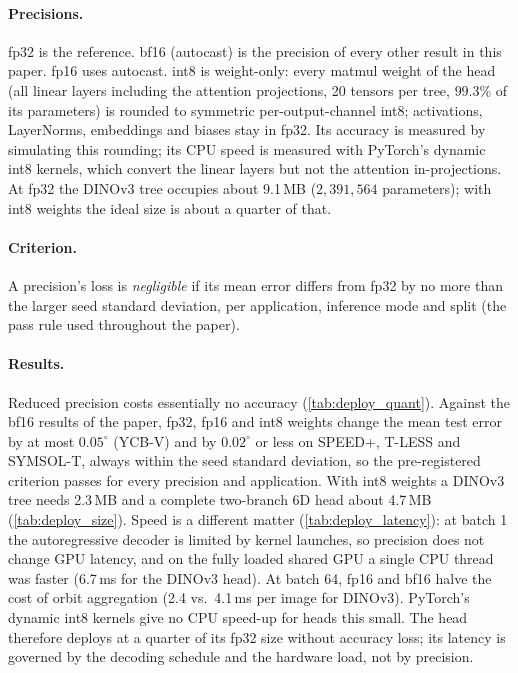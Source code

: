 \paragraph{Precisions.} fp32 is the reference. bf16 (autocast) is the precision of every other result in this paper. fp16 uses autocast. int8 is weight-only: every matmul weight of the head (all linear layers including the attention projections, 20 tensors per tree, $99.3\%$ of its parameters) is rounded to symmetric per-output-channel int8; activations, LayerNorms, embeddings and biases stay in fp32. Its accuracy is measured by simulating this rounding; its CPU speed is measured with PyTorch's dynamic int8 kernels, which convert the linear layers but not the attention in-projections. At fp32 the DINOv3 tree occupies about 9.1\,MB ($2{,}391{,}564$ parameters); with int8 weights the ideal size is about a quarter of that.

\paragraph{Criterion.} A precision's loss is \emph{negligible} if its mean error differs from fp32 by no more than the larger seed standard deviation, per application, inference mode and split (the pass rule used throughout the paper).

\paragraph{Results.} Reduced precision costs essentially no accuracy (\cref{tab:deploy_quant}). Against the bf16 results of the paper, fp32, fp16 and int8 weights change the mean test error by at most $0.05^\circ$ (YCB-V) and by $0.02^\circ$ or less on SPEED+, T-LESS and SYMSOL-T, always within the seed standard deviation, so the pre-registered criterion passes for every precision and application. With int8 weights a DINOv3 tree needs 2.3\,MB and a complete two-branch 6D head about 4.7\,MB (\cref{tab:deploy_size}). Speed is a different matter (\cref{tab:deploy_latency}): at batch 1 the autoregressive decoder is limited by kernel launches, so precision does not change GPU latency, and on the fully loaded shared GPU a single CPU thread was faster (6.7\,ms for the DINOv3 head). At batch 64, fp16 and bf16 halve the cost of orbit aggregation (2.4 vs.\ 4.1\,ms per image for DINOv3). PyTorch's dynamic int8 kernels give no CPU speed-up for heads this small. The head therefore deploys at a quarter of its fp32 size without accuracy loss; its latency is governed by the decoding schedule and the hardware load, not by precision.

